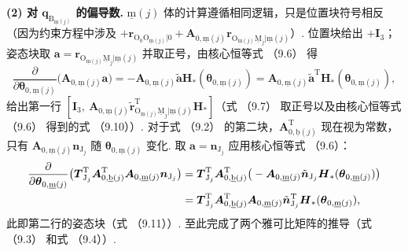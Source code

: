\textbf{(2) 对 $\boldsymbol{q}_{\text{B}_{\underline{\text{m}}(j)}}$ 的偏导数.}
$\underline{\text{m}}(j)$ 体的计算遵循相同逻辑，只是位置块符号相反（因为约束方程中涉及 $+\boldsymbol{r}_{\text{O}_0\text{O}_{\underline{\text{m}}(j)}|0} + \boldsymbol{A}_{0,\underline{\text{m}}(j)}\boldsymbol{r}_{\text{O}_{\underline{\text{m}}(j)}\underline{\text{M}}_j|\underline{\text{m}}(j)}$）. 位置块给出 $+\boldsymbol{I}_3$；姿态块取 $\boldsymbol{a} = \boldsymbol{r}_{\text{O}_{\underline{\text{m}}(j)}\underline{\text{M}}_j|\underline{\text{m}}(j)}$ 并取正号，由核心恒等式 （9.6） 得
\[
\frac{\partial}{\partial \boldsymbol{\theta}_{0,\underline{\text{m}}(j)}}\big(\boldsymbol{A}_{0,\underline{\text{m}}(j)}\boldsymbol{a}\big) = -\boldsymbol{A}_{0,\underline{\text{m}}(j)}\tilde{\boldsymbol{a}}\boldsymbol{H}_*(\boldsymbol{\theta}_{0,\underline{\text{m}}(j)}) = \boldsymbol{A}_{0,\underline{\text{m}}(j)}\tilde{\boldsymbol{a}}^\text{T}\boldsymbol{H}_*(\boldsymbol{\theta}_{0,\underline{\text{m}}(j)}),
\]
给出第一行 $[\boldsymbol{I}_3,\ \boldsymbol{A}_{0,\underline{\text{m}}(j)}\tilde{\boldsymbol{r}}_{\text{O}_{\underline{\text{m}}(j)}\underline{\text{M}}_j|\underline{\text{m}}(j)}^\text{T}\boldsymbol{H}_*]$（式 （9.7） 取正号以及由核心恒等式 （9.6） 得到的式 （9.10））.
对于式 （9.2） 的第二块，$\boldsymbol{A}_{0,\underline{\text{b}}(j)}^\text{T}$ 现在视为常数，只有 $\boldsymbol{A}_{0,\underline{\text{m}}(j)}\boldsymbol{n}_{\text{J}_j}$ 随 $\boldsymbol{\theta}_{0,\underline{\text{m}}(j)}$ 变化. 取 $\boldsymbol{a} = \boldsymbol{n}_{\text{J}_j}$ 应用核心恒等式 （9.6）：
\begin{align*}\frac{\partial}{\partial \boldsymbol{\theta}_{0,\underline{\text{m}}(j)}}\big(\boldsymbol{T}_{\text{J}_j}^\text{T}\boldsymbol{A}_{0,\underline{\text{b}}(j)}^\text{T}\boldsymbol{A}_{0,\underline{\text{m}}(j)}\boldsymbol{n}_{\text{J}_j}\big)
    &= \boldsymbol{T}_{\text{J}_j}^\text{T}\boldsymbol{A}_{0,\underline{\text{b}}(j)}^\text{T}\big(-\boldsymbol{A}_{0,\underline{\text{m}}(j)}\tilde{\boldsymbol{n}}_{\text{J}_j}\boldsymbol{H}_*(\boldsymbol{\theta}_{0,\underline{\text{m}}(j)})\big) \notag \\
    &= \boldsymbol{T}_{\text{J}_j}^\text{T}\boldsymbol{A}_{0,\underline{\text{b}}(j)}^\text{T}\boldsymbol{A}_{0,\underline{\text{m}}(j)}\tilde{\boldsymbol{n}}_{\text{J}_j}^\text{T}\boldsymbol{H}_*(\boldsymbol{\theta}_{0,\underline{\text{m}}(j)}),\end{align*}
此即第二行的姿态块（式 （9.11））. 至此完成了两个雅可比矩阵的推导（式 （9.3） 和式 （9.4））.

